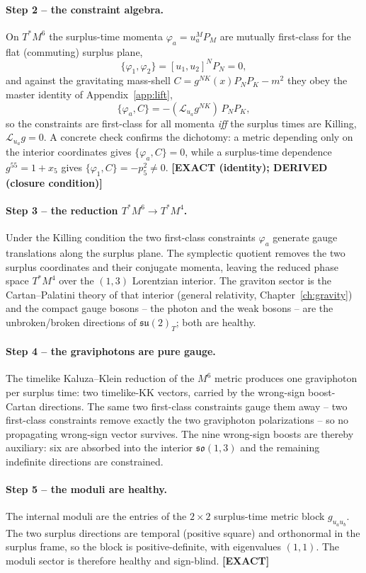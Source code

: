 \documentclass[11pt,oneside]{book}
\newcommand{\so}{\mathfrak{so}}
\newcommand{\Lie}{\mathcal{L}}
\newcommand{\status}[1]{{\sffamily\bfseries\color{statuscol}[#1]}}
\theoremstyle{plain}
\theoremstyle{definition}
\theoremstyle{remark}
\begin{document}
\paragraph{Step 2 -- the constraint algebra.}
On $T^*M^6$ the surplus-time momenta $\varphi_a=u_a^M P_M$ are mutually first-class for the flat
(commuting) surplus plane,
\[
  \{\varphi_1,\varphi_2\}=[u_1,u_2]^N P_N=0,
\]
and against the gravitating mass-shell $C=g^{NK}(x)P_NP_K-m^2$ they obey the master identity of
Appendix~\ref{app:lift},
\[
  \{\varphi_a,C\}=-(\Lie_{u_a}g^{NK})\,P_NP_K,
\]
so the constraints are first-class for all momenta \emph{iff} the surplus times are Killing,
$\Lie_{u_a}g=0$. A concrete check confirms the dichotomy: a metric depending only on the
interior coordinates gives $\{\varphi_a,C\}=0$, while a surplus-time dependence $g^{55}=1+x_5$
gives $\{\varphi_1,C\}=-p_5^2\neq0$. \status{EXACT (identity); DERIVED (closure condition)}

\paragraph{Step 3 -- the reduction $T^*M^6\to T^*M^4$.}
Under the Killing condition the two first-class constraints $\varphi_a$ generate gauge
translations along the surplus plane. The symplectic quotient removes the two surplus
coordinates and their conjugate momenta, leaving the reduced phase space $T^*M^4$ over the
$(1,3)$ Lorentzian interior. The graviton sector is the Cartan--Palatini theory of that interior
(general relativity, Chapter~\ref{ch:gravity}) and the compact gauge bosons -- the photon and the
weak bosons -- are the unbroken/broken directions of $\mathfrak{su}(2)_T$; both are healthy.

\paragraph{Step 4 -- the graviphotons are pure gauge.}
The timelike Kaluza--Klein reduction of the $M^6$ metric produces one graviphoton per surplus
time: two timelike-KK vectors, carried by the wrong-sign boost-Cartan directions. The same two
first-class constraints gauge them away -- two first-class constraints remove exactly the two
graviphoton polarizations -- so no propagating wrong-sign vector survives. The nine wrong-sign
boosts are thereby auxiliary: six are absorbed into the interior $\so(1,3)$ and the remaining
indefinite directions are constrained.

\paragraph{Step 5 -- the moduli are healthy.}
The internal moduli are the entries of the $2\times2$ surplus-time metric block $g_{u_au_b}$.
The two surplus directions are temporal (positive square) and orthonormal in the surplus frame,
so the block is positive-definite, with eigenvalues $(1,1)$. The moduli sector is therefore
healthy and sign-blind. \status{EXACT}
\end{document}

